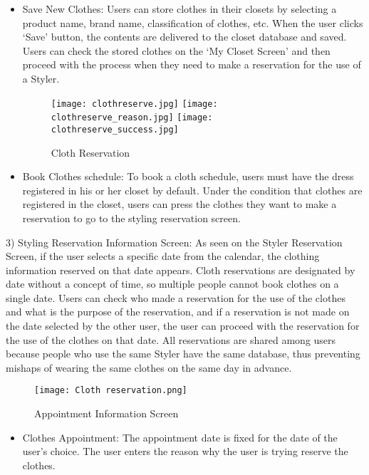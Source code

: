 \documentclass[conference]{IEEEtran}
\begin{document}
\begin{itemize}
    \item Save New Clothes: Users can store clothes in their closets by selecting a product name, brand name, classification of clothes, etc. When the user clicks ‘Save’ button, the contents are delivered to the closet database and saved. Users can check the stored clothes on the ‘My Closet Screen’ and then proceed with the process when they need to make a reservation for the use of a Styler.
    
    \begin{figure}[htbp]
    \centerline{
    \texttt{[image: clothreserve.jpg]}
    \texttt{[image: clothreserve\_reason.jpg]}
    \texttt{[image: clothreserve\_success.jpg]}
    }
    \label{fig}
    \caption{Cloth Reservation}
    \end{figure}
    \item Book Clothes schedule: To book a cloth schedule, users must have the dress registered in his or her closet by default. Under the condition that clothes are registered in the closet, users can press the clothes they want to make a reservation to go to the styling reservation screen.\\
\end{itemize}

3) Styling Reservation Information Screen: As seen on the Styler Reservation Screen, if the user selects a specific date from the calendar, the clothing information reserved on that date appears. Cloth reservations are designated by date without a concept of time, so multiple people cannot book clothes on a single date. Users can check who made a reservation for the use of the clothes and what is the purpose of the reservation, and if a reservation is not made on the date selected by the other user, the user can proceed with the reservation for the use of the clothes on that date. All reservations are shared among users because people who use the same Styler have the same database, thus preventing mishaps of wearing the same clothes on the same day in advance.\\

\newpage
\begin{figure}[htbp]
\centerline{\texttt{[image: Cloth reservation.png]}}
\label{fig}
\caption{Appointment Information Screen}
\end{figure}
\begin{itemize}
    \item Clothes Appointment: The appointment date is fixed for the date of the user’s choice. The user enters the reason why the user is trying reserve the clothes.
\end{itemize}
    
\end{document}
